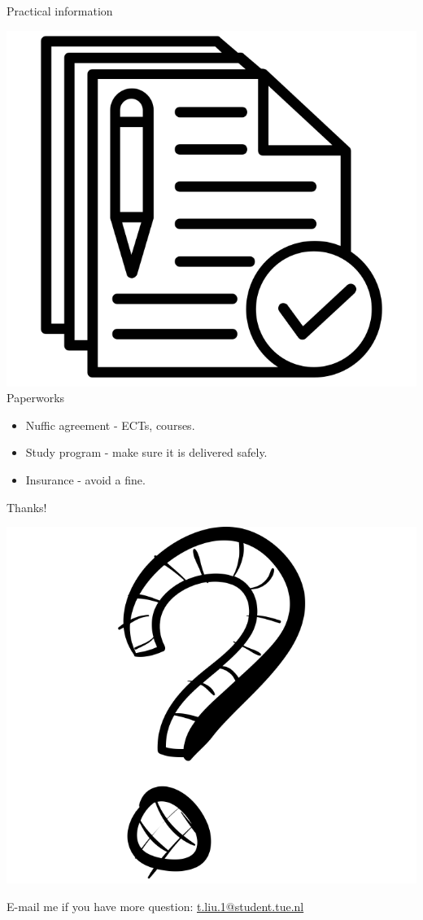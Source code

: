 \documentclass[12pt, aspectratio=43]{beamer}
\begin{document}
\begin{frame}{Practical information}
\begin{center}
    \includegraphics[scale=0.25]{images/Paperwork.png} \\
    Paperworks
\end{center}
\begin{itemize}
    \item Nuffic agreement - ECTs, courses.
    \item Study program - make sure it is delivered safely.
    \item Insurance - avoid a fine. 
\end{itemize}
\end{frame}

\begin{frame}{Thanks!}
\begin{center}
    \includegraphics[scale=0.17]{images/Question.png}
\end{center}
E-mail me if you have more question: \href{mailto:t.liu.1@student.tue.nl}{t.liu.1@student.tue.nl}
\end{frame}
\end{document}
